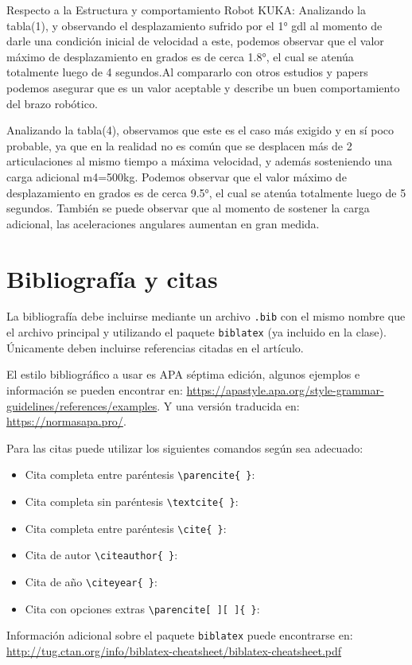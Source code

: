 \documentclass{aleph-revista}
\begin{document}
Respecto a la Estructura y comportamiento Robot KUKA:
Analizando la tabla(1), y observando el desplazamiento sufrido por el 1° gdl al momento de darle una condición inicial de velocidad a este, podemos observar que el valor máximo de desplazamiento en grados es de cerca 1.8°, el cual se atenúa totalmente luego de 4 segundos.Al compararlo con otros estudios y papers podemos asegurar que es un valor aceptable y describe un buen comportamiento del brazo robótico.

Analizando la tabla(4), observamos que este es el caso más exigido y en sí poco probable, ya que en la realidad no es común que se desplacen más de 2 articulaciones al mismo tiempo a máxima velocidad, y además sosteniendo una carga adicional m4=500kg. Podemos observar que el valor máximo de desplazamiento en grados es de cerca 9.5°, el cual se atenúa totalmente luego de 5 segundos. También se puede observar que al momento de sostener la carga adicional, las aceleraciones angulares aumentan en gran medida.


\section{Bibliografía y citas}

La bibliografía debe incluirse mediante un archivo \texttt{.bib} con el mismo nombre que el archivo principal y utilizando el paquete \texttt{biblatex} (ya incluido en la clase). Únicamente deben incluirse referencias citadas en el artículo.

El estilo bibliográfico a usar es APA séptima edición, algunos ejemplos e información se pueden encontrar en: \url{https://apastyle.apa.org/style-grammar-guidelines/references/examples}. Y una versión traducida en: \url{https://normasapa.pro/}.

Para las citas puede utilizar los siguientes comandos según sea adecuado:
\begin{itemize}
\item 
    Cita completa entre paréntesis \verb"\parencite{ }": \parencite{Bib06}
\item
    Cita completa sin paréntesis \verb"\textcite{ }": \textcite{Bib06}
\item 
    Cita completa entre paréntesis \verb"\cite{ }": \cite{Bib06}
\item
    Cita de autor \verb"\citeauthor{ }": \citeauthor{Bib06}
\item
    Cita de año \verb"\citeyear{ }": \citeyear{Bib06}
\item 
    Cita con opciones extras \verb"\parencite[ ][ ]{ }": \parencite[ver][pág. 66]{Bib06}
\end{itemize}
Información adicional sobre el paquete \texttt{biblatex} puede encontrarse en: \url{http://tug.ctan.org/info/biblatex-cheatsheet/biblatex-cheatsheet.pdf}
\end{document}
